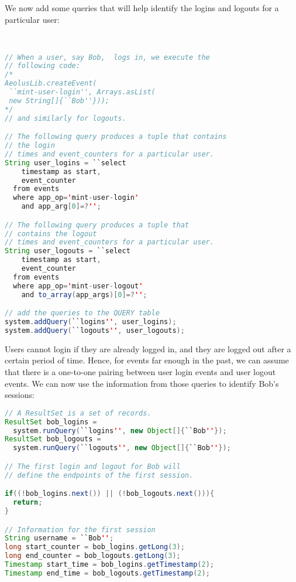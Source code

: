 We now add some queries that will help identify the logins and logouts for a particular user:

\begin{lstlisting}[language=Java]


// When a user, say Bob,  logs in, we execute the 
// following code:
/*
AeolusLib.createEvent(
 ``mint-user-login'', Arrays.asList(
 new String[]{``Bob''}));
*/
// and similarly for logouts.

// The following query produces a tuple that contains 
// the login
// times and event_counters for a particular user.
String user_logins = ``select 
    timestamp as start, 
    event_counter 
  from events 
  where app_op='mint-user-login' 
    and app_arg[0]=?'';

// The following query produces a tuple that 
// contains the logout
// times and event_counters for a particular user.
String user_logouts = ``select 
    timestamp as start, 
    event_counter 
  from events 
  where app_op='mint-user-logout' 
    and to_array(app_args)[0]=?'';

// add the queries to the QUERY table
system.addQuery(``logins'', user_logins);
system.addQuery(``logouts'', user_logouts);
\end{lstlisting}

\noindent
Users cannot login if they are already logged in, and they are logged out after a certain period of time. Hence, for events far enough in the past, we can assume that there is a one-to-one pairing between user login events and user logout events. We can now use the information from those queries to identify Bob's sessions:

\begin{lstlisting}[language=Java]
// A ResultSet is a set of records.
ResultSet bob_logins = 
  system.runQuery(``logins'', new Object[]{``Bob''});
ResultSet bob_logouts = 
  system.runQuery(``logouts'', new Object[]{``Bob''});

// The first login and logout for Bob will 
// define the endpoints of the first session.

if((!bob_logins.next()) || (!bob_logouts.next())){
  return;
}

// Information for the first session
String username = ``Bob'';
long start_counter = bob_logins.getLong(3);
long end_counter = bob_logouts.getLong(3);
Timestamp start_time = bob_logins.getTimestamp(2);
Timestamp end_time = bob_logouts.getTimestamp(2);
\end{lstlisting}

